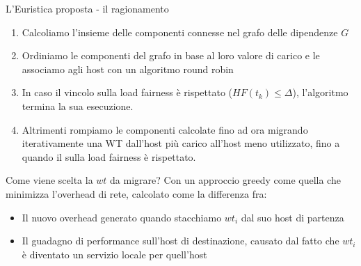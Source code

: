 \documentclass{beamer}
\begin{document}
\begin{frame}[allowframebreaks]{L'Euristica proposta - il ragionamento}
	\begin{enumerate}
		\item Calcoliamo l'insieme delle componenti connesse nel grafo delle dipendenze $G$
		\item Ordiniamo le componenti del grafo in base al loro valore di carico e le associamo agli host con un algoritmo round robin
		\item In caso il vincolo sulla load fairness è rispettato ($HF(t_k) \le \Delta$), l'algoritmo termina la sua esecuzione.
		\item Altrimenti rompiamo le componenti calcolate fino ad ora migrando iterativamente una WT dall'host più carico all'host meno utilizzato, fino a quando il sulla load fairness  è rispettato.
	\end{enumerate}

	\pagebreak
	
	\begin{block}{Come viene scelta la $wt$ da migrare?}
		Con un approccio greedy come quella che minimizza l'overhead di rete, calcolato come la differenza fra:
		\begin{itemize}
			\item Il nuovo overhead generato quando stacchiamo $wt_i$ dal suo host di partenza
			\item Il guadagno di performance sull'host di destinazione, causato dal fatto che $wt_i$ è diventato un servizio locale per quell'host
		\end{itemize}
	\end{block}
	
\end{frame}
\end{document}
